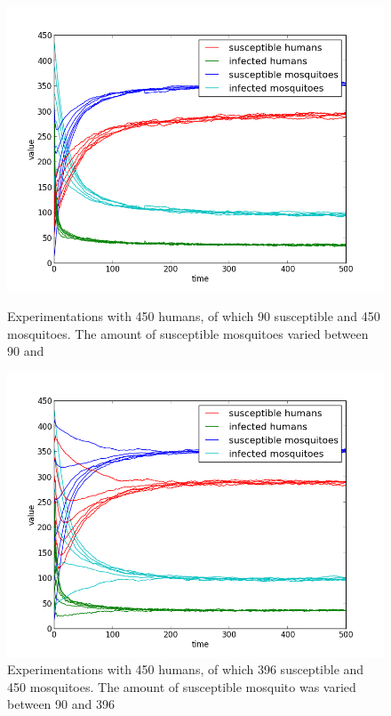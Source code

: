 \documentclass[a4paper]{report}
\begin{document}
\begin{figure}[ht]
    \begin{minipage}[b]{0.8\linewidth} 
        \centering
        \includegraphics[scale=0.7]{var_mosquito_suscept_05_02_05.png}
        \caption{Experimentations with 450 humans, of which 90 susceptible and 450
        mosquitoes. The amount of susceptible mosquitoes varied between 90 and }
        \label{fig:figure1}
    \end{minipage}
    \begin{minipage}[b]{0.8\linewidth}
        \centering
        \includegraphics[scale=0.7]{var_mosquito_suscept_05_08_05.png}
        \caption{Experimentations with 450 humans, of which 396 susceptible and 450
        mosquitoes. The amount of susceptible mosquito was varied between 90 and
        396}
        \label{fig:figure2}
    \end{minipage}
\end{figure}
\end{document}
